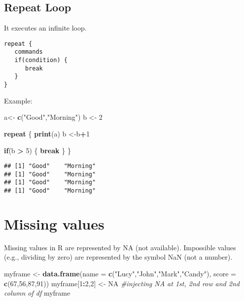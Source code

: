 \documentclass[]{book}
\newenvironment{Shaded}{\begin{snugshade}}{\end{snugshade}}
\newcommand{\KeywordTok}[1]{\textcolor[rgb]{0.13,0.29,0.53}{\textbf{#1}}}
\newcommand{\DataTypeTok}[1]{\textcolor[rgb]{0.13,0.29,0.53}{#1}}
\newcommand{\DecValTok}[1]{\textcolor[rgb]{0.00,0.00,0.81}{#1}}
\newcommand{\StringTok}[1]{\textcolor[rgb]{0.31,0.60,0.02}{#1}}
\newcommand{\CommentTok}[1]{\textcolor[rgb]{0.56,0.35,0.01}{\textit{#1}}}
\newcommand{\OtherTok}[1]{\textcolor[rgb]{0.56,0.35,0.01}{#1}}
\newcommand{\ControlFlowTok}[1]{\textcolor[rgb]{0.13,0.29,0.53}{\textbf{#1}}}
\newcommand{\OperatorTok}[1]{\textcolor[rgb]{0.81,0.36,0.00}{\textbf{#1}}}
\newcommand{\NormalTok}[1]{#1}
\theoremstyle{definition}
\theoremstyle{definition}
\theoremstyle{definition}
\theoremstyle{remark}
\begin{document}
\subsection{Repeat Loop}\label{repeat-loop}

It executes an infinite loop.

\begin{verbatim}
repeat { 
   commands 
   if(condition) {
      break
   }
}
\end{verbatim}

Example:

\begin{Shaded}
\begin{Highlighting}[]
\NormalTok{a<-}\StringTok{ }\KeywordTok{c}\NormalTok{(}\StringTok{"Good"}\NormalTok{,}\StringTok{"Morning"}\NormalTok{)}
\NormalTok{b <-}\StringTok{ }\DecValTok{2}

\ControlFlowTok{repeat}\NormalTok{ \{}
   \KeywordTok{print}\NormalTok{(a)}
\NormalTok{   b <-b}\OperatorTok{+}\DecValTok{1}
   
   \ControlFlowTok{if}\NormalTok{(b }\OperatorTok{>}\StringTok{ }\DecValTok{5}\NormalTok{) \{}
      \ControlFlowTok{break}
\NormalTok{   \}}
\NormalTok{\}}
\end{Highlighting}
\end{Shaded}

\begin{verbatim}
## [1] "Good"    "Morning"
## [1] "Good"    "Morning"
## [1] "Good"    "Morning"
## [1] "Good"    "Morning"
\end{verbatim}

\section{Missing values}\label{missing-values}

Missing values in R are represented by NA (not available). Impossible
values (e.g., dividing by zero) are represented by the symbol NaN (not a
number).

\begin{Shaded}
\begin{Highlighting}[]
\NormalTok{myframe <-}\StringTok{ }\KeywordTok{data.frame}\NormalTok{(}\DataTypeTok{name =} \KeywordTok{c}\NormalTok{(}\StringTok{"Lucy"}\NormalTok{,}\StringTok{"John"}\NormalTok{,}\StringTok{"Mark"}\NormalTok{,}\StringTok{"Candy"}\NormalTok{), }\DataTypeTok{score =} \KeywordTok{c}\NormalTok{(}\DecValTok{67}\NormalTok{,}\DecValTok{56}\NormalTok{,}\DecValTok{87}\NormalTok{,}\DecValTok{91}\NormalTok{))}
\NormalTok{myframe[}\DecValTok{1}\OperatorTok{:}\DecValTok{2}\NormalTok{,}\DecValTok{2}\NormalTok{] <-}\StringTok{ }\OtherTok{NA} \CommentTok{#injecting NA at 1st, 2nd row and 2nd column of df }
\NormalTok{myframe}
\end{Highlighting}
\end{Shaded}
\end{document}

